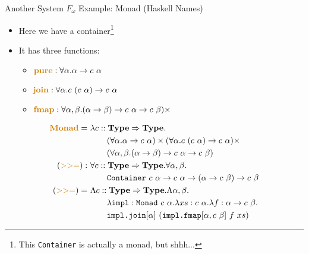 \documentclass[leqno,presentation,usenames,dvipsnames]{beamer}
\newcommand{\Type}{\textbf{Type}}
\newcommand{\highlight}[1]{{\color{deepOrange} \textbf{#1}}}
\begin{document}
\begin{frame}[fragile]{Another System $F_\omega$ Example: Monad (Haskell Names)}
    \begin{itemize}
        \item Here we have a container\footnote{This \texttt{Container} is actually a monad, but shhh...}
        \item It has three functions:
            \begin{itemize}
                \item $\highlight{pure} : \forall \alpha. \alpha \to c~\alpha$
                \item $\highlight{join} : \forall \alpha. c~(c~\alpha) \to c~\alpha$
                \item $\highlight{fmap} : \forall \alpha,\beta. (\alpha \to \beta) \to c~\alpha \to c~\beta) \times$
            \end{itemize}
    \end{itemize}
    \footnotesize
    \begin{align*}
        \highlight{Monad} = &~\lambda c :: \Type \Rightarrow \Type. \\
                             &~\qquad(\forall \alpha. \alpha \to c~\alpha) \times (\forall \alpha. c~(c~\alpha) \to c~\alpha) \times \\
                             &~\qquad(\forall \alpha,\beta. (\alpha \to \beta) \to c~\alpha \to c~\beta) \\
        (\highlight{$>>=$}) :&~ \forall c :: \Type \Rightarrow \Type. \forall \alpha, \beta. \\
                          &~\qquad \texttt{Container}~c~\alpha \to c~\alpha \to (\alpha \to c~\beta) \to c~\beta \\
        (\highlight{$>>=$}) =&~ \Lambda c :: \Type \Rightarrow \Type. \Lambda \alpha, \beta. \\
                          &~\qquad \lambda \texttt{impl} : \texttt{Monad}~c~\alpha. \lambda xs : c~\alpha. \lambda f : \alpha \to c~\beta. \\
                          &~\qquad \texttt{impl.join}[\alpha]~(\texttt{impl.fmap}[\alpha,c~\beta]~f~xs)
    \end{align*}
\end{frame}
\end{document}
